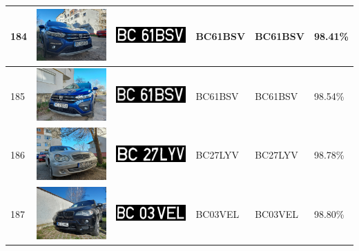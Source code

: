 \documentclass[a4paper,12pt]{report}
\begin{document}
\begin{longtable}{| m{0.6cm} | m{3cm} | m{3cm} | m{1.8cm} | m{1.8cm} | m{1.8cm} |}
    184 & \includegraphics[width=3cm,keepaspectratio]{dataset/114_d1.jpg} & \includegraphics[width=3cm,keepaspectratio]{segmentari/184.jpg} & BC61BSV             & BC61BSV              & 98.41\%    \\ \hline
    185 & \includegraphics[width=3cm,keepaspectratio]{dataset/114_s1.jpg} & \includegraphics[width=3cm,keepaspectratio]{segmentari/185.jpg} & BC61BSV             & BC61BSV              & 98.54\%    \\ \hline
    186 & \includegraphics[width=3cm,keepaspectratio]{dataset/115_s1.jpg} & \includegraphics[width=3cm,keepaspectratio]{segmentari/186.jpg} & BC27LYV             & BC27LYV              & 98.78\%    \\ \hline
    187 & \includegraphics[width=3cm,keepaspectratio]{dataset/116_d1.jpg} & \includegraphics[width=3cm,keepaspectratio]{segmentari/187.jpg} & BC03VEL             & BC03VEL              & 98.80\%    \\ \hline

\end{longtable}
\end{document}
